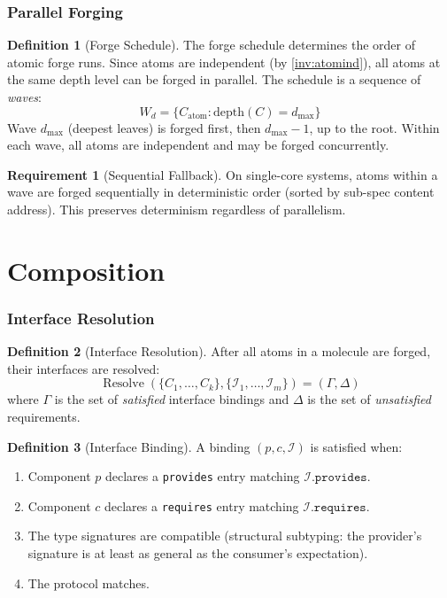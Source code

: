 \documentclass[11pt,a4paper,twoside]{article}
\theoremstyle{definition}
\newtheorem{definition}{Definition}[section]
\newtheorem{requirement}{Requirement}[section]
\theoremstyle{plain}
\theoremstyle{remark}
\newcommand{\calI}{\mathcal{I}}
\DeclareMathOperator{\Resolve}{Resolve}
\begin{document}
\section{Parallel Forging}\label{sec:parallel}

\begin{definition}[Forge Schedule]\label{def:forgesched}
The forge schedule determines the order of atomic forge runs. Since
atoms are independent (by \cref{inv:atomind}), all atoms at the same
depth level can be forged in parallel. The schedule is a sequence of
\emph{waves}:
\[
  W_d = \{C_{\mathrm{atom}} : \mathrm{depth}(C) = d_{\max}\}
\]
Wave $d_{\max}$ (deepest leaves) is forged first, then
$d_{\max} - 1$, up to the root. Within each wave, all atoms are
independent and may be forged concurrently.
\end{definition}

\begin{requirement}[Sequential Fallback]\label{req:seqfallback}
On single-core systems, atoms within a wave are forged sequentially
in deterministic order (sorted by sub-spec content address). This
preserves determinism regardless of parallelism.
\end{requirement}


\part{Composition}\label{part:compose}

\section{Interface Resolution}\label{sec:resolve}

\begin{definition}[Interface Resolution]\label{def:resolve}
After all atoms in a molecule are forged, their interfaces are
resolved:
\[
  \Resolve(\{C_1, \ldots, C_k\}, \{\calI_1, \ldots, \calI_m\})
  = (\Gamma, \Delta)
\]
where $\Gamma$ is the set of \emph{satisfied} interface bindings and
$\Delta$ is the set of \emph{unsatisfied} requirements.
\end{definition}

\begin{definition}[Interface Binding]\label{def:binding}
A binding $(p, c, \calI)$ is satisfied when:
\begin{enumerate}[nosep,label=(\roman*)]
  \item Component $p$ declares a \texttt{provides} entry matching
        $\calI.\mathtt{provides}$.
  \item Component $c$ declares a \texttt{requires} entry matching
        $\calI.\mathtt{requires}$.
  \item The type signatures are compatible (structural subtyping: the
        provider's signature is at least as general as the consumer's
        expectation).
  \item The protocol matches.
\end{enumerate}
\end{definition}
\end{document}

